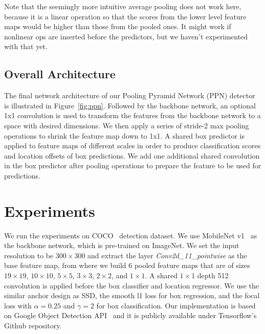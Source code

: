 \documentclass[10pt,twocolumn,letterpaper]{article}
\begin{document}
Note that the seemingly more intuitive average pooling does
not work here, because it is a linear operation so that the
scores from the lower level feature maps would be higher than
those from the pooled ones. It might work if nonlinear ops
are inserted before the predictors, but we haven't
experimented with that yet.


\subsection{Overall Architecture}


The final network architecture of our Pooling Pyramid
Network (PPN) detector is illustrated in
Figure~\ref{fig:ppn}.  Followed by the backbone network, an
optional 1x1 convolution is used to transform the features
from the backbone network to a space with desired
dimensions.  We then apply a series of stride-2 max pooling
operations to shrink the feature map down to 1x1.  A shared
box predictor is applied to feature maps of different scales
in order to produce classification scores and location
offsets of box predictions.  We add one additional shared
convolution in the box predictor after pooling operations to
prepare the feature to be used for predictions.


\section{Experiments}

We run the experiments on COCO~\cite{lin2014coco} detection dataset.
We use MobileNet v1~\cite{howard2017mobilenet} as the backbone network,
which is pre-trained on ImageNet.
We set the input resolution to be $300\times 300$ and
extract the layer \textit{Conv2d\_11\_pointwise} as the base feature map,
from where we build 6 pooled feature maps that are of sizes
$19\times 19$,
$10\times 10$,
$5\times 5$,
$3\times 3$,
$2\times 2$, and
$1\times 1$.
A shared $1\times 1$ depth 512 convolution is applied before the box classifier and location regressor.
We use the similar anchor design as SSD,
the smooth l1 loss for box regression,
and the focal loss with $\alpha=0.25$ and $\gamma=2$ for box classification.
Our implementation is based on Google Object Detection API~\cite{huang2017gmi}
and it is publicly available under Tensorflow's Github repository.
\end{document}
